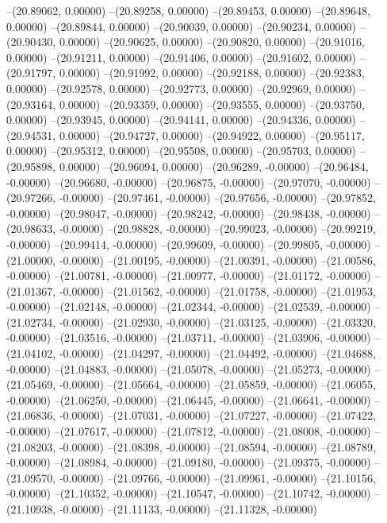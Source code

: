 --(20.89062, 0.00000)
--(20.89258, 0.00000)
--(20.89453, 0.00000)
--(20.89648, 0.00000)
--(20.89844, 0.00000)
--(20.90039, 0.00000)
--(20.90234, 0.00000)
--(20.90430, 0.00000)
--(20.90625, 0.00000)
--(20.90820, 0.00000)
--(20.91016, 0.00000)
--(20.91211, 0.00000)
--(20.91406, 0.00000)
--(20.91602, 0.00000)
--(20.91797, 0.00000)
--(20.91992, 0.00000)
--(20.92188, 0.00000)
--(20.92383, 0.00000)
--(20.92578, 0.00000)
--(20.92773, 0.00000)
--(20.92969, 0.00000)
--(20.93164, 0.00000)
--(20.93359, 0.00000)
--(20.93555, 0.00000)
--(20.93750, 0.00000)
--(20.93945, 0.00000)
--(20.94141, 0.00000)
--(20.94336, 0.00000)
--(20.94531, 0.00000)
--(20.94727, 0.00000)
--(20.94922, 0.00000)
--(20.95117, 0.00000)
--(20.95312, 0.00000)
--(20.95508, 0.00000)
--(20.95703, 0.00000)
--(20.95898, 0.00000)
--(20.96094, 0.00000)
--(20.96289, -0.00000)
--(20.96484, -0.00000)
--(20.96680, -0.00000)
--(20.96875, -0.00000)
--(20.97070, -0.00000)
--(20.97266, -0.00000)
--(20.97461, -0.00000)
--(20.97656, -0.00000)
--(20.97852, -0.00000)
--(20.98047, -0.00000)
--(20.98242, -0.00000)
--(20.98438, -0.00000)
--(20.98633, -0.00000)
--(20.98828, -0.00000)
--(20.99023, -0.00000)
--(20.99219, -0.00000)
--(20.99414, -0.00000)
--(20.99609, -0.00000)
--(20.99805, -0.00000)
--(21.00000, -0.00000)
--(21.00195, -0.00000)
--(21.00391, -0.00000)
--(21.00586, -0.00000)
--(21.00781, -0.00000)
--(21.00977, -0.00000)
--(21.01172, -0.00000)
--(21.01367, -0.00000)
--(21.01562, -0.00000)
--(21.01758, -0.00000)
--(21.01953, -0.00000)
--(21.02148, -0.00000)
--(21.02344, -0.00000)
--(21.02539, -0.00000)
--(21.02734, -0.00000)
--(21.02930, -0.00000)
--(21.03125, -0.00000)
--(21.03320, -0.00000)
--(21.03516, -0.00000)
--(21.03711, -0.00000)
--(21.03906, -0.00000)
--(21.04102, -0.00000)
--(21.04297, -0.00000)
--(21.04492, -0.00000)
--(21.04688, -0.00000)
--(21.04883, -0.00000)
--(21.05078, -0.00000)
--(21.05273, -0.00000)
--(21.05469, -0.00000)
--(21.05664, -0.00000)
--(21.05859, -0.00000)
--(21.06055, -0.00000)
--(21.06250, -0.00000)
--(21.06445, -0.00000)
--(21.06641, -0.00000)
--(21.06836, -0.00000)
--(21.07031, -0.00000)
--(21.07227, -0.00000)
--(21.07422, -0.00000)
--(21.07617, -0.00000)
--(21.07812, -0.00000)
--(21.08008, -0.00000)
--(21.08203, -0.00000)
--(21.08398, -0.00000)
--(21.08594, -0.00000)
--(21.08789, -0.00000)
--(21.08984, -0.00000)
--(21.09180, -0.00000)
--(21.09375, -0.00000)
--(21.09570, -0.00000)
--(21.09766, -0.00000)
--(21.09961, -0.00000)
--(21.10156, -0.00000)
--(21.10352, -0.00000)
--(21.10547, -0.00000)
--(21.10742, -0.00000)
--(21.10938, -0.00000)
--(21.11133, -0.00000)
--(21.11328, -0.00000)
